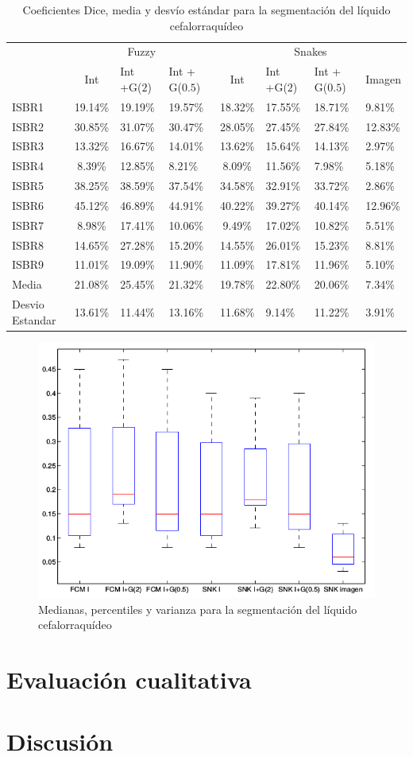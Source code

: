 \begin{table}[h]
	\centering
	\begin{tabular}{l|cll|clll}
		& \multicolumn{3}{c|}{Fuzzy} & \multicolumn{4}{c}{Snakes} \\ \cline{2-8} 
		& Int & Int +G($2$) & Int + G($0.5$) & Int & Int +G($2$) & Int + G($0.5$) & Imagen \\ \hline
		ISBR1 & 19.14\% & 19.19\% & 19.57\% & 18.32\% & 17.55\% & 18.71\% & 9.81\% \\
		ISBR2 & 30.85\% & 31.07\% & 30.47\% & 28.05\% & 27.45\% & 27.84\% & 12.83\% \\
		ISBR3 & 13.32\% & 16.67\% & 14.01\% & 13.62\% & 15.64\% & 14.13\% & 2.97\% \\
		ISBR4 & 8.39\% & 12.85\% & 8.21\% & 8.09\% & 11.56\% & 7.98\% & 5.18\% \\
		ISBR5 & 38.25\% & 38.59\% & 37.54\% & 34.58\% & 32.91\% & 33.72\% & 2.86\% \\
		ISBR6 & 45.12\% & 46.89\% & 44.91\% & 40.22\% & 39.27\% & 40.14\% & 12.96\% \\
		ISBR7 & 8.98\% & 17.41\% & 10.06\% & 9.49\% & 17.02\% & 10.82\% & 5.51\% \\
		ISBR8 & 14.65\% & 27.28\% & 15.20\% & 14.55\% & 26.01\% & 15.23\% & 8.81\% \\
		ISBR9 & 11.01\% & 19.09\% & 11.90\% & 11.09\% & 17.81\% & 11.96\% & 5.10\% \\ \hline
		Media & 21.08\% & 25.45\% & 21.32\% & 19.78\% & 22.80\% & 20.06\% & 7.34\% \\ \hline
		Desvio Estandar & 13.61\% & 11.44\% & 13.16\% & 11.68\% & 9.14\% & 11.22\% & 3.91\%
	\end{tabular}
	\caption{Coeficientes Dice, media y desvío estándar para la segmentación del líquido cefalorraquídeo}
	\label{table:resultados_liquido}
\end{table}

\begin{figure}[H]
	\centering
	\includegraphics[scale=0.5]{images/BoxPlotLC.png}
	\caption{Medianas, percentiles y varianza para la segmentación del líquido cefalorraquídeo}
	\label{fig:boxplotLC}
\end{figure}


\section{Evaluación cualitativa}
\section{Discusión}